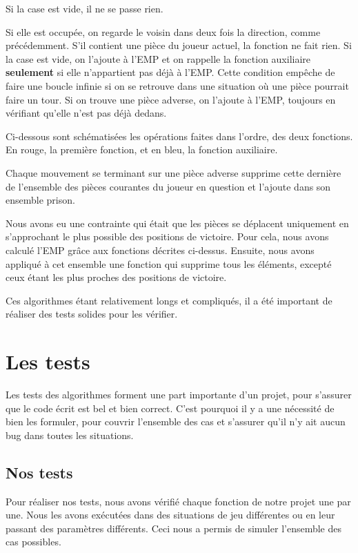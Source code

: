 \documentclass[a4paper]{article}
\begin{document}
Si la case est vide, il ne se passe rien.

Si elle est occupée, on regarde le voisin dans deux fois la direction, comme précédemment. S'il contient une pièce du joueur actuel, la fonction ne fait rien. Si la case est vide, on l'ajoute à l'EMP et on rappelle la fonction auxiliaire \large\textbf{seulement} \normalsize si elle n'appartient pas déjà à l'EMP. Cette condition empêche de faire une boucle infinie si on se retrouve dans une situation où une pièce pourrait faire un tour. Si on trouve une pièce adverse, on l'ajoute à l'EMP, toujours en vérifiant qu'elle n'est pas déjà dedans.

Ci-dessous sont schématisées les opérations faites dans l'ordre, des deux fonctions. En rouge, la première fonction, et en bleu, la fonction auxiliaire.


Chaque mouvement se terminant sur une pièce adverse supprime cette dernière de l'ensemble des pièces courantes du joueur en question et l'ajoute dans son ensemble prison.

\vspace{0.5cm}

Nous avons eu une contrainte qui était que les pièces se déplacent uniquement en s'approchant le plus possible des positions de victoire. Pour cela, nous avons calculé l'EMP grâce aux fonctions décrites ci-dessus. Ensuite, nous avons appliqué à cet ensemble une fonction qui supprime tous les éléments, excepté ceux étant les plus proches des positions de victoire.

Ces algorithmes étant relativement longs et compliqués, il a été important de réaliser des tests solides pour les vérifier.

\section{Les tests}
\label{tests}

Les tests des algorithmes forment une part importante d'un projet, pour s'assurer que le code écrit est bel et bien correct. C'est pourquoi il y a une nécessité de bien les formuler, pour couvrir l'ensemble des cas et s'assurer qu'il n'y ait aucun bug dans toutes les situations.

\subsection{Nos tests}
\label{nos test}

Pour réaliser nos tests, nous avons vérifié chaque fonction de notre projet une par une. Nous les avons exécutées dans des situations de jeu différentes ou en leur passant des paramètres différents. Ceci nous a permis de simuler l'ensemble des cas possibles.
\end{document}
